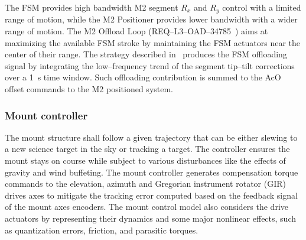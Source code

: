\documentclass{gmto}
\begin{document}
The FSM provides high bandwidth M2 segment $R_x$ and $R_y$ control with a limited range of motion, while the M2 Positioner provides lower bandwidth with a wider range of motion. The M2 Offload Loop (REQ--L3--OAD--34785~\cite{OAD}) aims at maximizing the available FSM stroke by maintaining the FSM actuators near the center of their range. The strategy described in~\cite[Section 6.4]{GMTO.NS.Alg.DOC} produces the FSM offloading signal by integrating the low--frequency trend of the segment tip--tilt corrections over a \SI{1}{s} time window. Such offloading contribution is summed to the AcO offset commands to the M2 positioned system.

\subsubsection{Mount controller}
\label{sec:mount-ctrl}

The mount structure shall follow a given trajectory that can be either slewing to a new science target in the sky or tracking a target. The controller ensures the mount stays on course while subject to various disturbances like the effects of gravity and wind buffeting. The mount controller generates compensation torque commands to the elevation, azimuth and Gregorian instrument rotator (GIR) drives axes to mitigate the tracking error computed based on the feedback signal of the mount axes encoders.  The mount control model also considers the drive actuators by representing their dynamics and some major nonlinear effects, such as quantization errors, friction, and parasitic torques.
\end{document}
